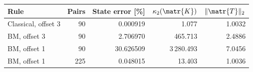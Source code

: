 \begin{tabular}{@{}lrrrr@{}}
\toprule
Rule & Pairs & State error [\%] & $\kappa_2(\matr{K})$ & $\|\matr{T}\|_2$\\
\midrule
Classical, offset 3 & 90 & 0.000919 & 1.077 & 1.0032\\
BM, offset 3 & 90 & 2.706970 & 465.713 & 2.4886\\
BM, offset 1 & 90 & 30.626509 & 3\,280.493 & 7.0456\\
BM, offset 1 & 225 & 0.048015 & 13.403 & 1.0036\\
\bottomrule
\end{tabular}
